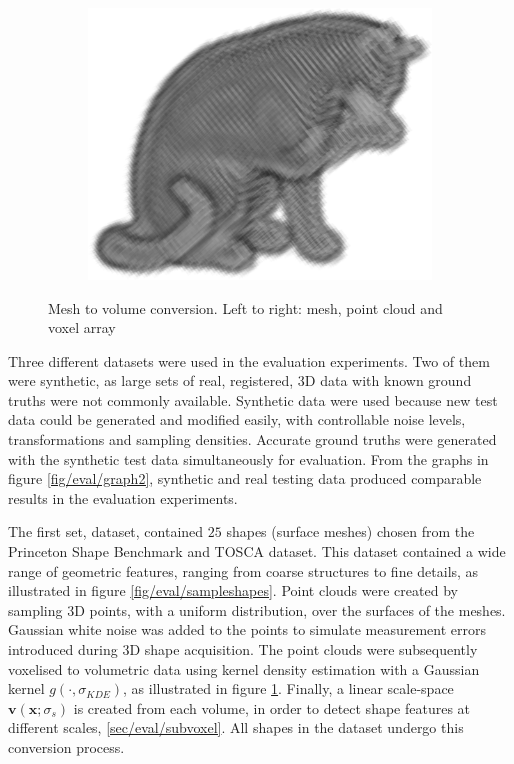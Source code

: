 \begin{figure}[ht]
	\begin{subfigure}[t]{0.31\linewidth} \centering 
		\includegraphics[height=0.85\linewidth]{./fig/eval/cat_volume.png}
	\end{subfigure}
	\caption{Mesh to volume conversion. Left to right: mesh, point cloud and voxel array} 
	\label{fig/eval/vol_conversion}
\end{figure}

Three different datasets were used in the evaluation experiments. Two of them were synthetic, as large sets of real, registered, 3D data with known ground truths were not commonly available. Synthetic data were used because new test data could be generated and modified easily, with controllable noise levels, transformations and sampling densities. Accurate ground truths were generated with the synthetic test data simultaneously for evaluation.  
From the graphs in figure \ref{fig/eval/graph2}, synthetic and real testing data produced comparable results in the evaluation experiments. 

The first set, \meshset dataset, contained $25$ shapes (surface meshes) chosen from the Princeton Shape Benchmark \cite{Shilane2004} and TOSCA \cite{Bronstein2008} dataset. 
This dataset contained a wide range of geometric features, ranging from coarse structures to fine details, as illustrated in figure \ref{fig/eval/sampleshapes}. Point clouds were created by sampling 3D points, with a uniform distribution, over the surfaces of the meshes. Gaussian white noise was added to the points to simulate measurement errors introduced during 3D shape acquisition. 
The point clouds were subsequently voxelised to volumetric data using kernel density estimation with a Gaussian kernel $g(\cdot,\sigma_{KDE})$, as illustrated in figure \ref{fig/eval/vol_conversion}.
Finally, a linear scale-space $\mathbf{v}(\mathbf{x};\sigma_s)$ is created from each volume, in order to detect shape features at different scales, \cf \ref{sec/eval/subvoxel}. All shapes in the dataset undergo this conversion process. 

